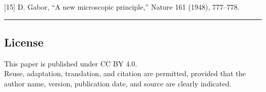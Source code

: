 \documentclass[
]{ltjsarticle}
\begin{document}
{[}15{]} D. Gabor, ``A new microscopic principle,'' Nature 161 (1948),
777--778.

\begin{center}\rule{0.5\linewidth}{0.5pt}\end{center}

\subsection{License}\label{license}

This paper is published under CC BY 4.0.\\
Reuse, adaptation, translation, and citation are permitted, provided
that the author name, version, publication date, and source are clearly
indicated.
\end{document}
